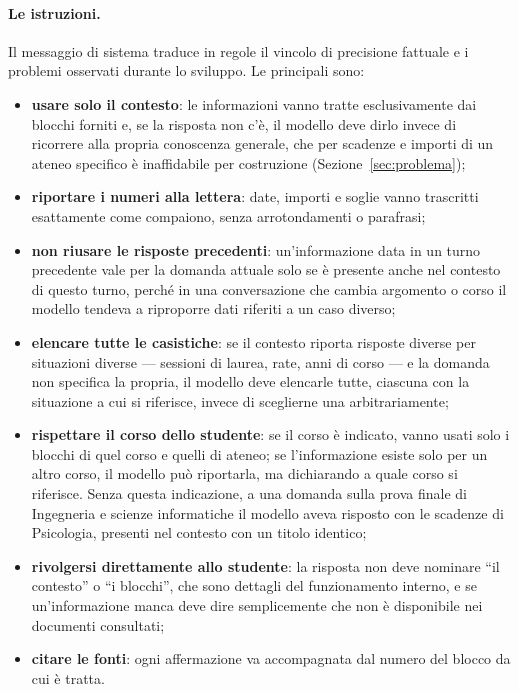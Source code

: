 \paragraph{Le istruzioni.} Il messaggio di sistema traduce in regole il vincolo di precisione fattuale e i problemi
osservati durante lo sviluppo. Le principali sono:
\begin{itemize}
  \item \textbf{usare solo il contesto}: le informazioni vanno tratte esclusivamente dai blocchi forniti e, se la
  risposta non c'è, il modello deve dirlo invece di ricorrere alla propria conoscenza generale, che per scadenze e
  importi di un ateneo specifico è inaffidabile per costruzione (Sezione~\ref{sec:problema});
  \item \textbf{riportare i numeri alla lettera}: date, importi e soglie vanno trascritti esattamente come
  compaiono, senza arrotondamenti o parafrasi;
  \item \textbf{non riusare le risposte precedenti}: un'informazione data in un turno precedente vale per la domanda
  attuale solo se è presente anche nel contesto di questo turno, perché in una conversazione che cambia argomento o
  corso il modello tendeva a riproporre dati riferiti a un caso diverso;
  \item \textbf{elencare tutte le casistiche}: se il contesto riporta risposte diverse per situazioni diverse ---
  sessioni di laurea, rate, anni di corso --- e la domanda non specifica la propria, il modello deve elencarle tutte,
  ciascuna con la situazione a cui si riferisce, invece di sceglierne una arbitrariamente;
  \item \textbf{rispettare il corso dello studente}: se il corso è indicato, vanno usati solo i blocchi di quel corso
  e quelli di ateneo; se l'informazione esiste solo per un altro corso, il modello può riportarla, ma dichiarando a
  quale corso si riferisce. Senza questa indicazione, a una domanda sulla prova finale di Ingegneria e scienze
  informatiche il modello aveva risposto con le scadenze di Psicologia, presenti nel contesto con un titolo
  identico;
  \item \textbf{rivolgersi direttamente allo studente}: la risposta non deve nominare ``il contesto'' o ``i blocchi'',
  che sono dettagli del funzionamento interno, e se un'informazione manca deve dire semplicemente che non è
  disponibile nei documenti consultati;
  \item \textbf{citare le fonti}: ogni affermazione va accompagnata dal numero del blocco da cui è tratta.
\end{itemize}

